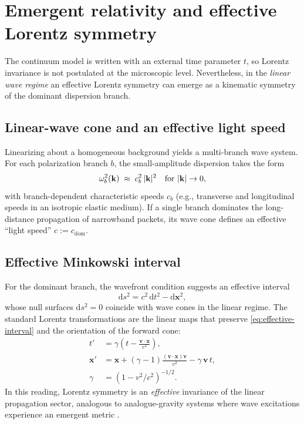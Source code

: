 \section{Emergent relativity and effective Lorentz symmetry}
\label{sec:emergent-relativity}

The continuum model is written with an external time parameter $t$, so Lorentz invariance is not
postulated at the microscopic level. Nevertheless, in the \emph{linear wave regime} an effective
Lorentz symmetry can emerge as a kinematic symmetry of the dominant dispersion branch.

\subsection{Linear-wave cone and an effective light speed}

Linearizing  about a homogeneous background yields a multi-branch wave system.
For each polarization branch $b$, the small-amplitude dispersion takes the form
\begin{equation}
  \omega_b^2(\mathbf{k})\;\approx\; c_b^2\,|\mathbf{k}|^2 \quad \text{for } |\mathbf{k}|\to 0,
  \label{eq:linear-dispersion}
\end{equation}
with branch-dependent characteristic speeds $c_b$ (e.g., transverse and longitudinal speeds in
an isotropic elastic medium). If a single branch dominates the long-distance propagation of
narrowband packets, its wave cone defines an effective ``light speed'' $c:=c_{\mathrm{dom}}$.

\subsection{Effective Minkowski interval}

For the dominant branch, the wavefront condition suggests an effective interval
\begin{equation}
  \mathrm{d}s^2 = c^2\,\mathrm{d}t^2 - \mathrm{d}\mathbf{x}^2 ,
  \label{eq:effective-interval}
\end{equation}
whose null surfaces $\mathrm{d}s^2=0$ coincide with wave cones in the linear regime. The standard
Lorentz transformations are the linear maps that preserve \eqref{eq:effective-interval} and the
orientation of the forward cone:
\begin{align}
t' &= \gamma\left(t - \frac{\mathbf{v}\cdot\mathbf{x}}{c^2}\right), \\
\mathbf{x}' &= \mathbf{x} + (\gamma-1)\frac{(\mathbf{v}\cdot\mathbf{x})\mathbf{v}}{v^2} - \gamma\,\mathbf{v}\,t, \\
\gamma &= (1-v^2/c^2)^{-1/2}.
\end{align}
In this reading, Lorentz symmetry is an \emph{effective} invariance of the linear propagation sector,
analogous to analogue-gravity systems where wave excitations experience an emergent metric
\citep{Barcelo2011AnalogueGravity}.

